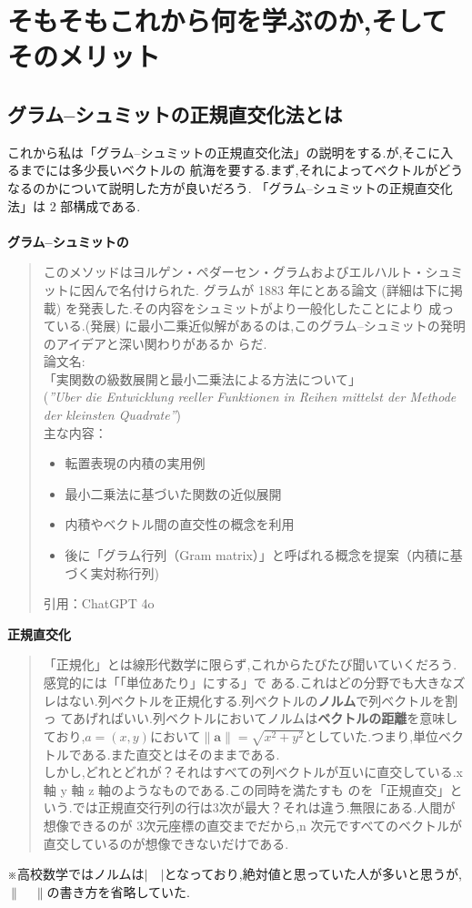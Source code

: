 \section{そもそもこれから何を学ぶのか,そしてそのメリット}\label{sec:startGram}
\subsection{グラム--シュミットの正規直交化法とは}
これから私は「グラム--シュミットの正規直交化法」の説明をする.が,そこに入るまでには多少長いベクトルの
航海を要する.まず,それによってベクトルがどうなるのかについて説明した方が良いだろう.
「グラム--シュミットの正規直交化法」は 2 部構成である.\\\\
\noindent
\textbf{グラム--シュミットの}
\begin{quote}
    このメソッドはヨルゲン・ペダーセン・グラムおよびエルハルト・シュミットに因んで名付けられた.
グラムが 1883 年にとある論文 (詳細は下に掲載) を発表した.その内容をシュミットがより一般化したことにより
成っている.(発展) に最小二乗近似解があるのは,このグラム--シュミットの発明のアイデアと深い関わりがあるか
らだ.
\vspace{1cm}\\
論文名:\\
「実関数の級数展開と最小二乗法による方法について」\\
 (\textit{”Uber die Entwicklung reeller Funktionen in Reihen mittelst der Methode der kleinsten Quadrate”})\\
主な内容：
\begin{itemize}
    \item 転置表現の内積の実用例
    \item 最小二乗法に基づいた関数の近似展開
    \item 内積やベクトル間の直交性の概念を利用
    \item 後に「グラム行列（Gram matrix）」と呼ばれる概念を提案（内積に基づく実対称行列)
\end{itemize}
引用：ChatGPT 4o
\end{quote}
\textbf{正規直交化}
\begin{quote}
「正規化」とは線形代数学に限らず,これからたびたび聞いていくだろう.感覚的には「「単位あたり」にする」で
ある.これはどの分野でも大きなズレはない.列ベクトルを正規化する.列ベクトルの\textbf{ノルム}で列ベクトルを割っ
てあげればいい.列ベクトルにおいてノルムは\textbf{ベクトルの距離}を意味しており,$a=(x,y)$において$\|\mathbf{a}\|=\sqrt{x^2+y^2}$としていた.つまり,単位ベクトルである.また直交とはそのままである.\\
\hspace{1em}しかし,どれとどれが？それはすべての列ベクトルが互いに直交している.x 軸 y 軸 z 軸のようなものである.この同時を満たすも
のを「正規直交」という.では正規直交行列の行は3次が最大？それは違う.無限にある.人間が想像できるのが
3次元座標の直交までだから,n 次元ですべてのベクトルが直交しているのが想像できないだけである.\\
\end{quote}
※高校数学ではノルムは$|\quad|$となっており,絶対値と思っていた人が多いと思うが,$\|\quad\|$の書き方を省略していた.

